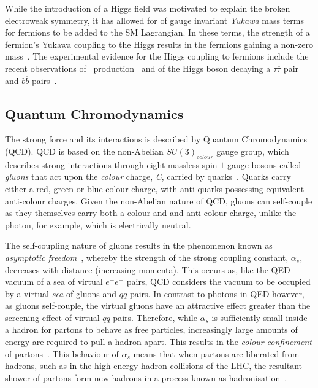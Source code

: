 While the introduction of a Higgs field was motivated to explain the broken electroweak symmetry, it has allowed for of gauge invariant \emph{Yukawa} mass terms for fermions to be added to the SM Lagrangian.
In these terms, the strength of a fermion's Yukawa coupling to the Higgs results in the fermions gaining a non-zero mass~\cite{Cheng:1985bj}.
The experimental evidence for the Higgs coupling to fermions include the recent observations of \ttH~production~\cite{Sirunyan:2018hoz} and of the Higgs boson decaying a $\tau \overline{\tau}$ pair~\cite{CERN-EP-2018-221} and $b \overline{b}$ pairs~\cite{Sirunyan:2017guj}.

\subsection{Quantum Chromodynamics}\label{subsec:QCD}
The strong force and its interactions is described by Quantum Chromodynamics (QCD).
QCD is based on the non-Abelian $SU(3)_{colour}$ gauge group, which describes strong interactions through eight massless spin-$1$ gauge bosons called \emph{gluons} that act upon the \emph{colour} charge, \emph{C}, carried by quarks~\cite{ElectroweakStrong}.
Quarks carry either a red, green or blue colour charge, with anti-quarks possessing equivalent anti-colour charges.
Given the non-Abelian nature of QCD, gluons can self-couple as they themselves carry both a colour and and anti-colour charge, unlike the photon, for example, which is electrically neutral.

The self-coupling nature of gluons results in the phenomenon known as \emph{asymptotic freedom}~\cite{ElectroweakStrong,coughlan2006ideas,devenish2004deep}, whereby the strength of the strong coupling constant, $\alpha_{s}$, decreases with distance (increasing momenta).
This occurs as, like the QED vacuum of a sea of virtual $e^{+}e^{-}$ pairs, QCD considers the vacuum to be occupied by a virtual \emph{sea} of gluons and $q\overline{q}$ pairs.
In contrast to photons in QED however, as gluons self-couple, the virtual gluons have an attractive effect greater than the screening effect of virtual $q\overline{q}$ pairs.
Therefore, while $\alpha_{s}$ is sufficiently small inside a hadron for partons to behave as free particles, increasingly large amounts of energy are required to pull a hadron apart.
This results in the \emph{colour confinement} of partons~\cite{ElectroweakStrong,Griffiths,devenish2004deep}.
This behaviour of $\alpha_{s}$ means that when partons are liberated from hadrons, such as in the high energy hadron collisions of the LHC, the resultant shower of partons form new hadrons in a process known as hadronisation~\cite{Andersson:1983ia}.

